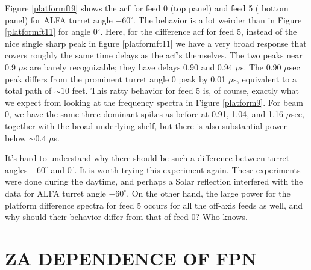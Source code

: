 \documentclass[psfig,preprint]{aastex}
\begin{document}
	Figure \ref{platformft9} shows the acf for feed 0 (top panel)
and feed 5 ( bottom panel) for ALFA turret angle $-60^\circ$.  The
behavior is a lot weirder than in Figure \ref{platformft11} for angle
$0^\circ$.  Here, for the difference acf for feed 5, instead of the nice
single sharp peak in figure \ref{platformft11} we have a very broad
response that covers roughly the same time delays as the acf's
themselves.  The two peaks near 0.9 $\mu$s are barely recognizable; they
have delays 0.90 and 0.94 $\mu$s.  The 0.90 $\mu$sec peak differs from
the prominent turret angle 0 peak by 0.01 $\mu$s, equivalent to a total path of
$\sim 10$ feet.  This ratty behavior for feed 5 is, of course, exactly
what we expect from looking at the frequency spectra in Figure
\ref{platform9}.  For beam 0, we have the same three dominant spikes as
before at 0.91, 1.04, and 1.16 $\mu$sec, together with the broad
underlying shelf, but there is also substantial power below $\sim 0.4$
$\mu$s. 

	It's hard to understand why there should be such a difference
between turret angles $-60^\circ$ and $0^\circ$.  It is worth trying
this experiment again.  These experiments were done during the daytime,
and perhaps a Solar reflection interfered with the data for ALFA turret
angle $-60^\circ$.  On the other hand, the large power for the platform
difference spectra for feed 5 occurs for all the off-axis feeds as
well, and why should their behavior differ from that of feed 0? Who
knows. 

\section{ZA DEPENDENCE OF FPN} \label{za}
\end{document}
